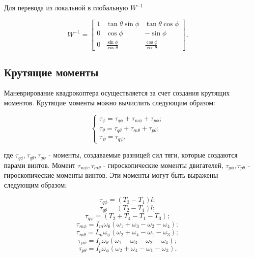 Для перевода из локальной в глобальную \(W^{-1}\)

\begin{equation}
W^{-1} = \begin{bmatrix}
1 & \tan\theta \sin\phi & \tan\theta \cos\phi \\
0 & \cos\phi & -\sin\phi \\
0 & \frac{\sin\phi}{\cos\theta} & \frac{\cos\phi}{\cos\theta}
\end{bmatrix}.
\end{equation}

\subsection{Крутящие моменты}

Маневрирование квадрокоптера осуществляется за счет создания крутящих моментов. 
Крутящие моменты можно вычислить следующим образом:

\begin{equation}
\begin{cases}
    \tau_{\phi} = \tau_{q\phi} + \tau_{m\phi} + \tau_{p\phi};\\
    \tau_{\theta} = \tau_{q\theta} + \tau_{m\theta} + \tau_{p\theta};\\
    \tau_{\psi} = \tau_{q\psi},
\end{cases}
\end{equation}

где \(\tau_{q\phi}, \tau_{q\theta}, \tau_{q\psi}\) - моменты, создаваемые разницей сил тяги, которые создаются парами винтов.
Момент \(\tau_{m\phi}, \tau_{m\theta}\) - гироскопические моменты двигателей, \(\tau_{p\phi}, \tau_{p\theta}\)
 - гироскопические моменты винтов. Эти моменты могут быть выражены следующим образом:

\begin{equation}
\tau_{q\phi} = (T_3 - T_1)l;
\end{equation}
\begin{equation}
\tau_{q\theta} = (T_2 - T_4)l;
\end{equation} 
\begin{equation}
\tau_{q\psi} = (T_2 + T_4 - T_1 - T_3);
\end{equation} 
\begin{equation}
\tau_{m\phi} = I_m \omega_{\theta}(\omega_1+\omega_3-\omega_2-\omega_4);
\end{equation} 
\begin{equation}
\tau_{m\theta} = I_m \omega_{\phi}(\omega_2+\omega_4-\omega_1-\omega_3);
\end{equation} 
\begin{equation}
\tau_{p\phi} = I_p \omega_{\theta}(\omega_1+\omega_3-\omega_2-\omega_4);
\end{equation} 
\begin{equation}
\tau_{p\theta} = I_p \omega_{\phi}(\omega_2+\omega_4-\omega_1-\omega_3).
\end{equation} 

